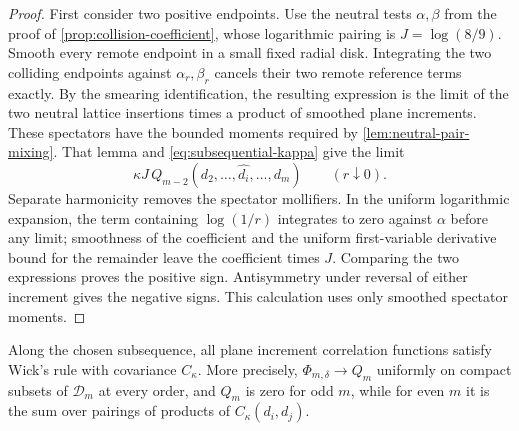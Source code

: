 \begin{proof}
First consider two positive endpoints. Use the neutral tests
\(\alpha,\beta\) from the proof of \cref{prop:collision-coefficient}, whose
logarithmic pairing is \(J=\log(8/9)\). Smooth every remote endpoint in a
small fixed radial disk. Integrating the two colliding endpoints against
\(\alpha_r,\beta_r\) cancels their two remote reference terms exactly.
By the smearing identification, the resulting expression is the limit
of the two neutral lattice insertions times a product of smoothed plane
increments. These spectators have the bounded moments required by
\cref{lem:neutral-pair-mixing}. That lemma and
\cref{eq:subsequential-kappa} give the limit
\[
       \kappa J\,Q_{m-2}(d_2,\ldots,\widehat{d_i},\ldots,d_m)
       \qquad(r\downarrow0).
\]
Separate harmonicity removes the spectator mollifiers. In the uniform
logarithmic expansion, the term containing \(\log(1/r)\) integrates to
zero against \(\alpha\) before any limit; smoothness of the coefficient
and the uniform first-variable derivative bound for the remainder leave
the coefficient times \(J\). Comparing the two expressions proves the
positive sign. Antisymmetry under reversal of either increment gives the
negative signs. This calculation uses only smoothed spectator moments.
\end{proof}

\begin{proposition}
\label{prop:plane-gaussian-moments}
Along the chosen subsequence, all plane increment correlation functions
satisfy Wick's rule with covariance \(C_\kappa\). More precisely,
\(\Phi_{m,\delta}\to Q_m\) uniformly on compact subsets of \(\mathcal D_m\)
at every order, and \(Q_m\) is zero for odd \(m\), while for even \(m\)
it is the sum over pairings of products of \(C_\kappa(d_i,d_j)\).
\end{proposition}

